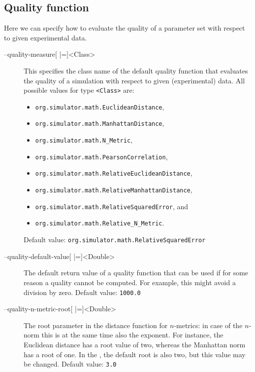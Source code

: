 \subsection{Quality function}
Here we can specify how to evaluate the quality of a parameter set with respect to given experimental data.
\begin{description}
\item[--quality-measure{[} |={]}<Class>]
          This specifies the class name of the default quality function
          that evaluates the quality of a simulation with respect to given
          (experimental) data.
          All possible values for type \texttt{<Class>} are:
          \begin{itemize}
          \item\texttt{org.simulator.math.EuclideanDistance},
          \item\texttt{org.simulator.math.ManhattanDistance},
          \item\texttt{org.simulator.math.N\_Metric},
          \item\texttt{org.simulator.math.PearsonCorrelation},
          \item\texttt{org.simulator.math.RelativeEuclideanDistance},
          \item\texttt{org.simulator.math.RelativeManhattanDistance},
          \item\texttt{org.simulator.math.RelativeSquaredError}, and
          \item\texttt{org.simulator.math.Relative\_N\_Metric}.
          \end{itemize}
          Default value: \texttt{org.simulator.math.RelativeSquaredError}
\item[--quality-default-value{[} |={]}<Double>]
          The default return value of a quality function that can be used
          if for some reason a quality cannot be computed. For example,
          this might avoid a division by zero.
          Default value: \texttt{1000.0}
\item[--quality-n-metric-root{[} |={]}<Double>]
          The root parameter in the distance function for $n$-metrics: in
          case of the $n$-norm this is at the same time also the exponent.
          For instance, the Euclidean distance has a root value of two,
          whereas the Manhattan norm has a root of one. In the \RSE, the
          default root is also two, but this value may be changed.
          Default value: \texttt{3.0}
\end{description}

